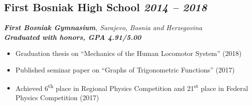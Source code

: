 \subsection*{\textbf{First Bosniak High School} \hfill \textit{2014 -- 2018}}  
\noindent\textit{\textbf{First Bosniak Gymnasium}, Sarajevo, Bosnia and Herzegovina} \\
\noindent\textit{\textbf{Graduated with honors, GPA 4.91/5.00}} 
\begin{itemize}[leftmargin=*,noitemsep,topsep=3pt]
    \item Graduation thesis on \enquote{Mechanics of the Human Locomotor System} (2018)
    \item Published seminar paper on \enquote{Graphs of Trigonometric Functions} (2017)
    \item Achieved 6\textsuperscript{th} place in Regional Physics Competition and 21\textsuperscript{st} place in Federal Physics Competition (2017)
\end{itemize}
\vspace{20pt}